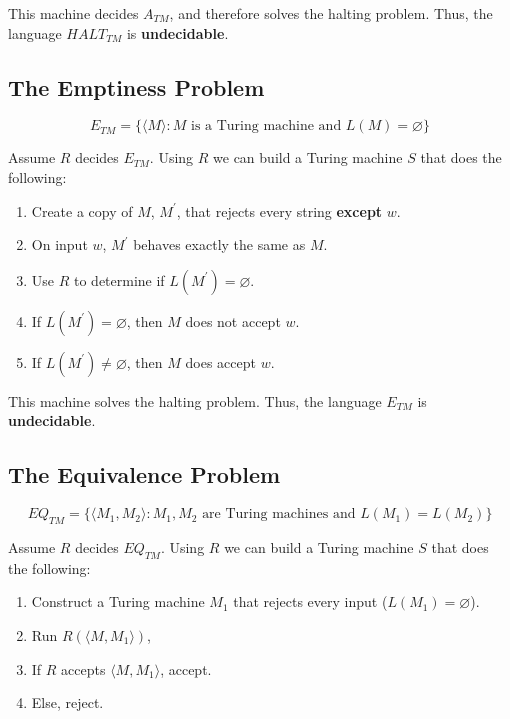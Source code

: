 \documentclass[12pt]{article}
\begin{document}
\noindent
This machine decides $A_{TM}$, and therefore solves the halting problem.
Thus, the language $HALT_{TM}$ is \textbf{undecidable}.

\newpage
\subsection*{The Emptiness Problem}

\[ E_{TM} = \{\langle M \rangle : M \text{ is a Turing machine and } L(M) = \varnothing\} \]

\noindent
Assume $R$ decides $E_{TM}$.
Using $R$ we can build a Turing machine $S$ that does the following:

\begin{enumerate}
    \item Create a copy of $M$, $M^\prime$, that rejects every string \textbf{except} $w$.
    \item On input $w$, $M^\prime$ behaves exactly the same as $M$.
    \item Use $R$ to determine if $L(M^\prime) = \varnothing$.
    \item If $L(M^\prime) = \varnothing$, then $M$ does not accept $w$.
    \item If $L(M^\prime) \neq \varnothing$, then $M$ does accept $w$.
\end{enumerate}

\noindent
This machine solves the halting problem.
Thus, the language $E_{TM}$ is \textbf{undecidable}.

\subsection*{The Equivalence Problem}

\[ EQ_{TM} = \{\langle M_1, M_2 \rangle : M_1, M_2 \text{ are Turing machines and } L(M_1) = L(M_2)\} \]

\noindent
Assume $R$ decides $EQ_{TM}$.
Using $R$ we can build a Turing machine $S$ that does the following:

\begin{enumerate}
    \item Construct a Turing machine $M_1$ that rejects every input ($L(M_1) = \varnothing$).
    \item Run $R(\langle M, M_1 \rangle)$,
    \item If $R$ accepts $\langle M, M_1 \rangle$, accept.
    \item Else, reject.
\end{enumerate}
\end{document}
